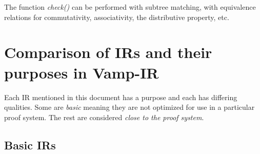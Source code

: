 \documentclass[
    9pt,            %
    techreport,        %
    affiltop,       %
]{art}
\begin{document}
The function \textit{check()} can be performed with subtree matching, with equivalence relations for commutativity, associativity, the distributive property, etc.

\section{Comparison of IRs and their purposes in Vamp-IR}

Each IR mentioned in this document has a purpose and each has differing qualities. Some are \emph{basic} meaning they are not optimized for use in a particular proof system. The rest are considered \emph{close to the proof system}.

\subsection{Basic IRs}
\end{document}
